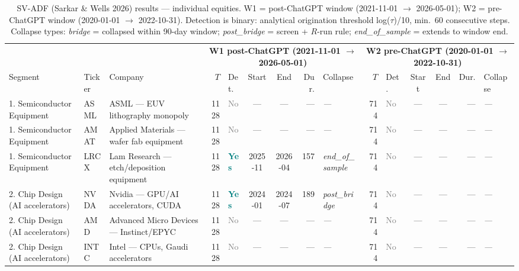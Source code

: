 \begin{table}[htbp]
\centering
\small
\setlength{\tabcolsep}{4pt}
\caption{SV-ADF (Sarkar \& Wells 2026) results --- individual equities. W1 = post-ChatGPT window (2021-11-01 $\to$ 2026-05-01); W2 = pre-ChatGPT window (2020-01-01 $\to$ 2022-10-31). Detection is binary: analytical origination threshold log($\tau$)/10, min.\ 60 consecutive steps. Collapse types: \textit{bridge} = collapsed within 90-day window; \textit{post\_bridge} = screen + $R$-run rule; \textit{end\_of\_sample} = extends to window end.}
\label{tab:svadf_equity}
\begin{tabular}{llp{3cm}r l cc r l  r l cc r l}
\toprule
 & & & \multicolumn{6}{c}{\textbf{W1 post-ChatGPT (2021-11-01 $\to$ 2026-05-01)}} & \multicolumn{6}{c}{\textbf{W2 pre-ChatGPT (2020-01-01 $\to$ 2022-10-31)}} \\
\cmidrule(lr){4-9} \cmidrule(lr){10-15}
Segment & Ticker & Company & $T$ & Det. & Start & End & Dur. & Collapse & $T$ & Det. & Start & End & Dur. & Collapse \\
\midrule
1. Semiconductor Equipment & ASML & ASML --- EUV lithography monopoly & 1128 & \textcolor{gray}{No} & --- & --- & --- & \textit{---} & 714 & \textcolor{gray}{No} & --- & --- & --- & \textit{---} \\
1. Semiconductor Equipment & AMAT & Applied Materials --- wafer fab equipment & 1128 & \textcolor{gray}{No} & --- & --- & --- & \textit{---} & 714 & \textcolor{gray}{No} & --- & --- & --- & \textit{---} \\
1. Semiconductor Equipment & LRCX & Lam Research --- etch/deposition equipment & 1128 & \textcolor{teal}{\textbf{Yes}} & 2025-11 & 2026-04 & 157 & \textit{end\_of\_sample} & 714 & \textcolor{gray}{No} & --- & --- & --- & \textit{---} \\
\midrule
2. Chip Design (AI accelerators) & NVDA & Nvidia --- GPU/AI accelerators, CUDA & 1128 & \textcolor{teal}{\textbf{Yes}} & 2024-01 & 2024-07 & 189 & \textit{post\_bridge} & 714 & \textcolor{gray}{No} & --- & --- & --- & \textit{---} \\
2. Chip Design (AI accelerators) & AMD & Advanced Micro Devices --- Instinct/EPYC & 1128 & \textcolor{gray}{No} & --- & --- & --- & \textit{---} & 714 & \textcolor{gray}{No} & --- & --- & --- & \textit{---} \\
2. Chip Design (AI accelerators) & INTC & Intel --- CPUs, Gaudi accelerators & 1128 & \textcolor{gray}{No} & --- & --- & --- & \textit{---} & 714 & \textcolor{gray}{No} & --- & --- & --- & \textit{---} \\

\end{tabular}
\end{table}
